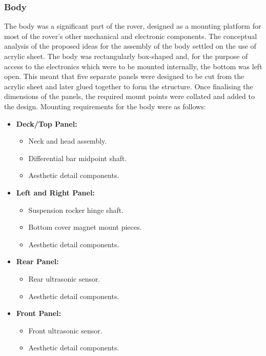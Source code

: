     \subsubsection{Body}
      The body was a significant part of the rover, designed as a mounting platform for most of the rover's other mechanical and electronic components. The conceptual analysis of the proposed ideas for the assembly of the body settled on the use of acrylic sheet. The body was rectangularly box-shaped and, for the purpose of access to the electronics which were to be mounted internally, the bottom was left open. This meant that five separate panels were designed to be cut from the acrylic sheet and later glued together to form the structure. Once finalising the dimensions of the panels, the required mount points were collated and added to the design. Mounting requirements for the body were as follows:
      
      \begin{itemize}
        \item \textbf{Deck/Top Panel:}
        \begin{itemize}
          \item Neck and head assembly.
          \item Differential bar midpoint shaft.
          \item Aesthetic detail components.
        \end{itemize}
        \item \textbf{Left and Right Panel:}
        \begin{itemize}
          \item Suspension rocker hinge shaft.
          \item Bottom cover magnet mount pieces.
          \item Aesthetic detail components.
        \end{itemize}
        \item \textbf{Rear Panel:}
        \begin{itemize}
          \item Rear ultrasonic sensor.
          \item Aesthetic detail components.
        \end{itemize}
        \item \textbf{Front Panel:}
        \begin{itemize}
          \item Front ultrasonic sensor.
          \item Aesthetic detail components.
        \end{itemize}
      \end{itemize}
      
